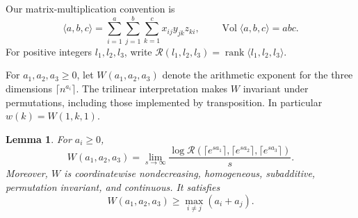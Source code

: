 \documentclass[11pt]{article}
\numberwithin{equation}{section}
\newtheorem{lemma}[theorem]{Lemma}
\theoremstyle{definition}
\theoremstyle{remark}
\DeclareMathOperator{\rank}{rank}
\DeclareMathOperator{\Vol}{Vol}
\begin{document}
Our matrix-multiplication convention is
\[
 \langle a,b,c\rangle
 =\sum_{i=1}^{a}\sum_{j=1}^{b}\sum_{k=1}^{c}x_{ij}y_{jk}z_{ki},
 \qquad \Vol\langle a,b,c\rangle=abc.
\]
For positive integers \(l_1,l_2,l_3\), write
\(\mathcal R(l_1,l_2,l_3)=\rank\langle l_1,l_2,l_3\rangle\).

For \(a_1,a_2,a_3\ge0\), let \(W(a_1,a_2,a_3)\) denote the arithmetic
exponent for the three dimensions \(\lceil n^{a_i}\rceil\).
The trilinear interpretation makes \(W\) invariant under permutations,
including those implemented by transposition.
In particular \(w(k)=W(1,k,1)\).

\begin{lemma}\label{lem:rank-exponent}
For \(a_i\ge0\),
\begin{equation}\label{eq:rank-exponent}
 W(a_1,a_2,a_3)=
 \lim_{s\to\infty}\frac{\log\mathcal R
   (\lceil e^{sa_1}\rceil,\lceil e^{sa_2}\rceil,
          \lceil e^{sa_3}\rceil)}{s}.
\end{equation}
Moreover, \(W\) is coordinatewise nondecreasing, homogeneous,
subadditive, permutation invariant, and continuous.  It satisfies
\[
 W(a_1,a_2,a_3)\ge\max_{i\ne j}(a_i+a_j).
\]
\end{lemma}
\end{document}
